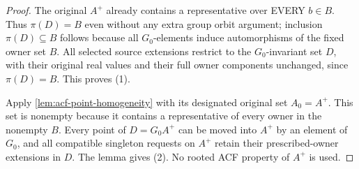 \begin{proof}
The original \(A^+\) already contains
a representative over EVERY \(b\in B\).
Thus \(\pi(D)=B\) even without any
extra group orbit argument; inclusion
\(\pi(D)\subseteq B\) follows because
all \(G_0\)-elements induce automorphisms
of the fixed owner set \(B\).
All selected source extensions restrict to the $G_0$-invariant
set $D$, with their original real values and their full owner
components unchanged, since $\pi(D)=B$. This proves (1).

Apply \cref{lem:acf-point-homogeneity} with its designated
original set $A_0=A^+$. This set is nonempty because it contains
a representative of every owner in the nonempty $B$.
Every point of $D=G_0A^+$ can be moved into $A^+$ by an element
of $G_0$, and all compatible singleton requests on $A^+$ retain
their prescribed-owner extensions in $D$. The lemma gives (2).
No rooted ACF property of $A^+$ is used.
\end{proof}

